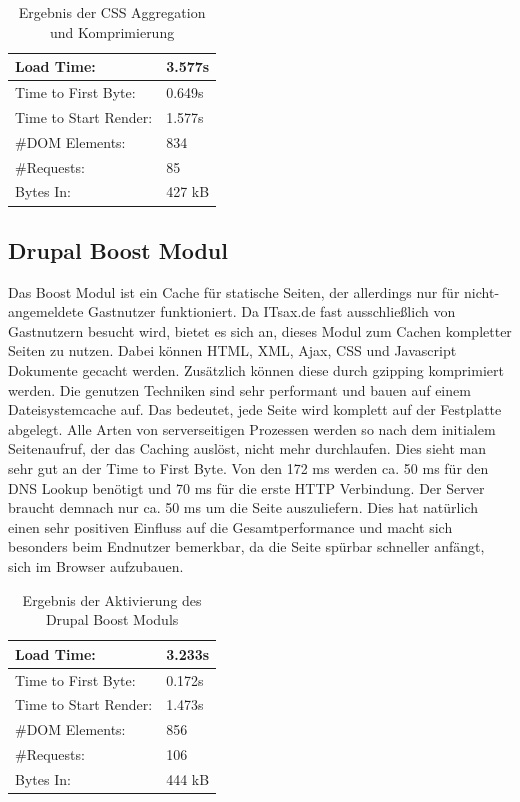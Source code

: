 \begin{table}[!ht]
\centering
\caption{Ergebnis der CSS Aggregation und Komprimierung}
    \begin{tabular}{ | p{3cm} | p{1.5cm} | }
    \hline
    Load Time: 			& 3.577s 	\\ \hline
    Time to First Byte:		& 0.649s  	\\ \hline
    Time to Start Render:	& 1.577s	\\ \hline
    \#DOM Elements:		& 834 		\\ \hline
    \#Requests:			& 85 		\\ \hline
    Bytes In:			& 427 kB 	\\ \hline
    \hline
    \end{tabular}
\end{table}

\subsection{Drupal Boost Modul} 
Das Boost Modul ist ein Cache für statische Seiten, der allerdings nur für nicht-angemeldete Gastnutzer funktioniert. Da ITsax.de fast ausschließlich von Gastnutzern besucht wird, bietet es sich an, dieses Modul zum Cachen kompletter Seiten zu nutzen. Dabei k\"onnen HTML, XML, Ajax, CSS und Javascript Dokumente gecacht werden. Zus\"atzlich k\"onnen diese durch gzipping komprimiert werden.
Die genutzen Techniken sind sehr performant und bauen auf einem Dateisystemcache auf. Das bedeutet, jede Seite wird komplett auf der Festplatte abgelegt. Alle Arten von serverseitigen Prozessen werden so nach dem initialem Seitenaufruf, der das Caching auslöst, nicht mehr durchlaufen. Dies sieht man sehr gut an der Time to First Byte. Von den 172 ms werden ca. 50 ms für den DNS Lookup benötigt und 70 ms für die erste HTTP Verbindung. Der Server braucht demnach nur ca. 50 ms um die Seite auszuliefern. Dies hat natürlich einen sehr positiven Einfluss auf die Gesamtperformance und macht sich besonders beim Endnutzer bemerkbar, da die Seite spürbar schneller anfängt, sich im Browser aufzubauen.

\begin{table}[!ht]
\centering
\caption{Ergebnis der Aktivierung des Drupal Boost Moduls}
    \begin{tabular}{ | p{3cm} | p{1.5cm} | }
    \hline
    Load Time: 			& 3.233s 	\\ \hline
    Time to First Byte:		& 0.172s  	\\ \hline
    Time to Start Render:	& 1.473s	\\ \hline
    \#DOM Elements:		& 856 		\\ \hline
    \#Requests:			& 106 		\\ \hline
    Bytes In:			& 444 kB 	\\ \hline
    \hline
    \end{tabular}
\end{table}


